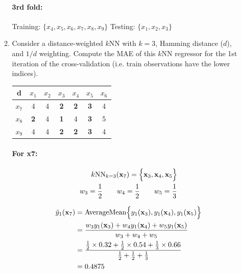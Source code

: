 \documentclass[12pt]{article}
\begin{document}
\begin{enumerate}[leftmargin=\labelsep]
\begin{enumerate}
        \paragraph{3rd fold:} Training: $\{x_4, x_5, x_6, x_7, x_8, x_9\}$ Testing: $\{x_1, x_2, x_3\}$
        \item  Consider a distance-weighted $k$NN with $k = 3$, Hamming distance ($d$), and $1/d$ weighting.
        Compute the MAE of this $k$NN regressor for the 1st iteration of the cross-validation (i.e. train
        observations have the lower indices).
        
        \begin{center}
            \begin{tabular}{|c|c|c|c|c|c|c|}
                \hline
                d & $x_1$ & $x_2$ & $x_3$ & $x_4$ & $x_5$ & $x_6$ \\
                \hline
                $x_7$ & 4 & 4 & \textbf{2} & \textbf{2} & \textbf{3} & 4 \\
                \hline
                $x_8$ & \textbf{2} & 4 & \textbf{1} & 4 & \textbf{3} & 5 \\
                \hline
                $x_9$ & 4 & 4 & \textbf{2} & \textbf{2} & \textbf{3} & 4 \\
                \hline
            \end{tabular}
        \end{center}

        \paragraph{For x7:}

        \begin{equation}
        \begin{split}
            k\textrm{NN}_{k = 3}(\mathbf{x}_7) = \Bigl\{ \mathbf{x}_3, \mathbf{x}_4, \mathbf{x}_5\Bigr\} \\
            w_3 = \frac{1}{2} \qquad w_4 = \frac{1}{2} \qquad w_5 = \frac{1}{3}
        \end{split}
        \end{equation}

        \begin{equation}
        \begin{split}
            \hat{y}_1(\mathbf{x}_7) &= \textrm{AverageMean}\Bigl\{ y_1(\mathbf{x}_3), y_1(\mathbf{x}_4), y_1(\mathbf{x}_5) \Bigr\} \\
            &= \frac{w_3y_1(\mathbf{x}_3) + w_4y_1(\mathbf{x}_4) + w_5y_1(\mathbf{x}_5)}{w_3 + w_4 + w_5} \\
            &= \frac{\frac{1}{2} \times 0.32 + \frac{1}{2} \times 0.54 + \frac{1}{3} \times 0.66}{\frac{1}{2} + \frac{1}{2} + \frac{1}{3}} \\
            &= 0.4875
        \end{split}
        \end{equation}


\end{enumerate}
\end{enumerate}
\end{document}
